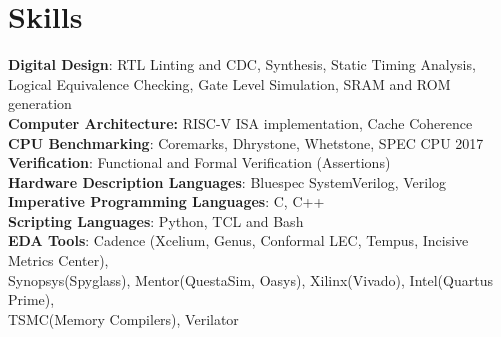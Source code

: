 \section{\sc Skills}

{\bf{Digital Design}}: RTL Linting and CDC, Synthesis, Static Timing Analysis,\\
Logical Equivalence Checking, Gate Level Simulation, SRAM and ROM generation \\
{\bf{Computer Architecture:}} RISC-V ISA implementation, Cache Coherence\\
{\bf{CPU Benchmarking}}: Coremarks, Dhrystone, Whetstone, SPEC CPU 2017 \\
{\bf{Verification}}: Functional and Formal Verification (Assertions)\\
{\bf{Hardware Description Languages}}: Bluespec SystemVerilog, Verilog \\
{\bf{Imperative Programming Languages}}: C, C++ \\
{\bf{Scripting Languages}}: Python, TCL and Bash  \\
{\bf{EDA Tools}}: Cadence (Xcelium, Genus, Conformal LEC, Tempus, Incisive Metrics Center), \\
Synopsys(Spyglass), Mentor(QuestaSim, Oasys), Xilinx(Vivado), Intel(Quartus Prime), 
\\ TSMC(Memory Compilers), Verilator 

\endinput
